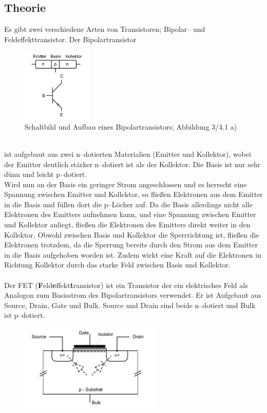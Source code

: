 \documentclass[10pt]{article}
\begin{document}
\begin{multicols}{2}
	\section{Theorie}
	Es gibt zwei verschiedene Arten von Transistoren; Bipolar-- und Feldeffekttransistor.
	Der Bipolartransistor
	\begin{figure}[h]
		\centering
		\includegraphics[width=0.3\textwidth]{bipolartransistor.png}
		\caption{Schaltbild und Aufbau eines Bipolartransistors; Abbildung 3/4.1 a) \cite{Praktikumsanleitung}}
	\end{figure}\\
	ist aufgebaut aus zwei n--dotierten Materialien (Emitter und Kollektor), wobei der Emitter deutlich stärker n--dotiert ist als der Kollektor.
	Die Basis ist nur sehr dünn und leicht p--dotiert.
	\\\indent Wird nun an der Basis ein geringer Strom angeschlossen und es herrscht eine Spannung zwischen Emitter und Kollektor, so fließen Elektronen aus dem Emitter in die Basis und füllen dort die p--Löcher auf.
	Da die Basis allerdings nicht alle Elektronen des Emitters aufnehmen kann, und eine Spannung zwischen Emitter und Kollektor anliegt, fließen die Elektronen des Emitters direkt weiter in den Kollektor.
	Obwohl zwischen Basis und Kollektor die Sperrrichtung ist, fließen die Elektronen trotzdem, da die Sperrung bereits durch den Strom aus dem Emitter in die Basis aufgehoben worden ist.
	Zudem wirkt eine Kraft auf die Elektronen in Richtung Kollektor durch das starke Feld zwischen Basis und Kollektor.
	\\\\ Der FET (\textbf{F}eld\textbf{e}ffekt\textbf{t}ransistor) ist ein Transistor der ein elektrisches Feld als Analogon zum Basisstrom des Bipolartransistors verwendet.
	Er ist Aufgebaut aus Source, Drain, Gate und Bulk.
	Source und Drain sind beide n--dotiert und Bulk ist p--dotiert.
	\begin{figure}[h]
		\centering
		\includegraphics[width=0.6\textwidth]{fet.png}

\end{figure}
\end{multicols}
\end{document}
